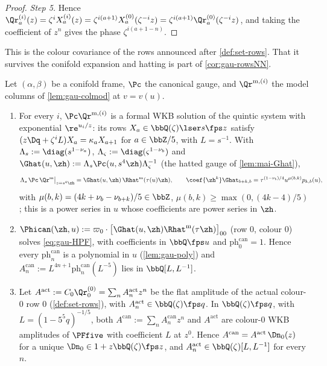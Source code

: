 \begin{proof}
\emph{Step 5.} Hence $\Qr^{(i)}_a(z)=\zeta^iX^{(i)}_a(z)=\zeta^{i(a+1)}X^{(0)}_a(\zeta^{-i}z)=\zeta^{i(a+1)}\Qr^{(0)}_a(\zeta^{-i}z)$, and taking the coefficient of $z^n$ gives the phase $\zeta^{i(a+1-n)}$.
\end{proof}

This is the colour covariance of the rows announced after \cref{def:set-rows}. That it survives the conifold expansion and hatting is part of \cref{cor:gau-rowsNN}.

\begin{thm}
\label{thm:gau-R0}
Let $(\alpha,\beta)$ be a conifold frame, $\Pc$ the canonical gauge, and $\Qr^{\mathrm m,(i)}$ the model columns of \cref{lem:gau-colmod} at $v=v(u)$.
\begin{enumerate}
\item For every $i$, $\Pc\Qr^{\mathrm m,(i)}$ is a formal WKB solution of the quintic system with exponential $\re^{u_i/z}$: its rows $X_a\in\bbQ(\zeta)\lser s\fps z$ satisfy $(z\Dq+\zeta^iL)X_a=\kappa_aX_{a+1}$ for $a\in\bbZ/5$, with $L=s^{-1}$. With $\Lambda_s:=\diag(s^{1-\nu_a})$, $\Lambda_\varsigma:=\diag(\varsigma^{1-\nu_b})$ and $\Ghat(u,\zh):=\Lambda_s\Pc(u,s^4\zh)\Lambda_\varsigma^{-1}$ (the hatted gauge of \cref{lem:mai-Ghat}),
\[
\Lambda_s\,\Pc\,\Qr^{\mathrm m}\big|_{z=s^4\zh}=\Ghat(u,\zh)\,\Rhat^{\mathrm m}(\tau(u)\zh),\qquad \coef{\zh^k}\Ghat_{b+k,b}=\tau^{(1-\nu_b)/4}u^{\mu(b,k)}p_{k,b}(u),
\]
with $\mu(b,k)=(4k+\nu_b-\nu_{b+k})/5\in\bbZ$, $\mu(b,k)\geq\max(0,(4k-4)/5)$; this is a power series in $u$ whose coefficients are power series in $\zh$.
\item $\Phican(\zh,u):=\varpi_0\cdot\bigl[\Ghat(u,\zh)\Rhat^{\mathrm m}(\tau\zh)\bigr]_{00}$ (row $0$, colour $0$) solves \eqref{eq:gau-HPF}, with coefficients in $\bbQ\fps u$ and $\mathrm{ph}^{\mathrm{can}}_0=1$. Hence every $\mathrm{ph}^{\mathrm{can}}_n$ is a polynomial in $u$ (\cref{lem:gau-poly}) and $A^{\mathrm{can}}_n:=L^{4n+1}\mathrm{ph}^{\mathrm{can}}_n(L^{-5})$ lies in $\bbQ[L,L^{-1}]$.
\item Let $A^{\mathrm{act}}:=C_0\Qr^{(0)}_0=\sum_nA^{\mathrm{act}}_nz^n$ be the flat amplitude of the actual colour-$0$ row $0$ (\cref{def:set-rows}), with $A^{\mathrm{act}}_n\in\bbQ(\zeta)\fps q$. In $\bbQ(\zeta)\fps q$, with $L=(1-5^5q)^{-1/5}$, both $A^{\mathrm{can}}:=\sum_nA^{\mathrm{can}}_nz^n$ and $A^{\mathrm{act}}$ are colour-$0$ WKB amplitudes of $\PFfive$ with coefficient $L$ at $z^0$. Hence $A^{\mathrm{can}}=A^{\mathrm{act}}\,\Dn_0(z)$ for a unique $\Dn_0\in1+z\bbQ(\zeta)\fps z$, and $A^{\mathrm{act}}_n\in\bbQ(\zeta)[L,L^{-1}]$ for every $n$.

\end{enumerate}
\end{thm}

